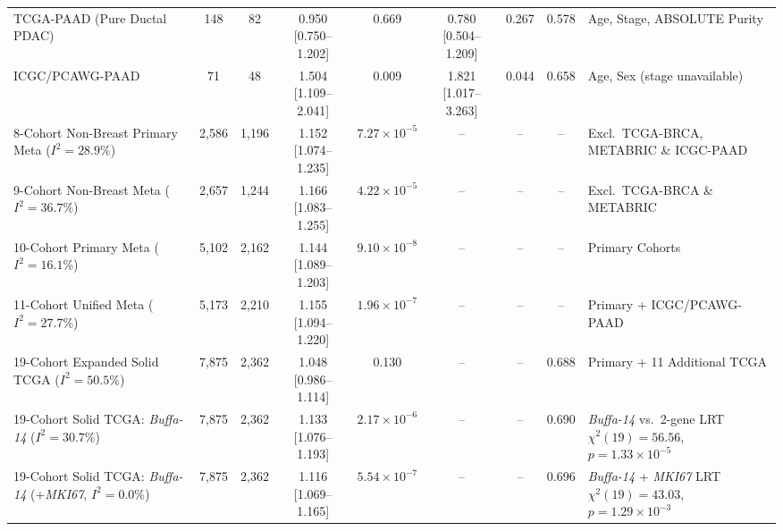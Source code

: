 \documentclass[10pt,twocolumn]{article}
\begin{document}
\begin{table}[t]
{\begin{tabular}{@{}lccccccc>{\raggedright\arraybackslash}p{3.9cm}@{}}
\midrule
TCGA-PAAD (Pure Ductal PDAC) & 148 & 82 & 0.950 [0.750--1.202] & 0.669 & 0.780 [0.504--1.209] & 0.267 & 0.578 & Age, Stage, ABSOLUTE Purity \\
ICGC/PCAWG-PAAD & 71 & 48 & 1.504 [1.109--2.041] & 0.009 & 1.821 [1.017--3.263] & 0.044 & 0.658 & Age, Sex (stage unavailable) \\
\midrule
8-Cohort Non-Breast Primary Meta ($I^2 = 28.9\%$) & 2,586 & 1,196 & 1.152 [1.074--1.235] & $7.27 \times 10^{-5}$ & -- & -- & -- & Excl.\ TCGA-BRCA, METABRIC \& ICGC-PAAD \\
9-Cohort Non-Breast Meta ($I^2 = 36.7\%$) & 2,657 & 1,244 & 1.166 [1.083--1.255] & $4.22 \times 10^{-5}$ & -- & -- & -- & Excl.\ TCGA-BRCA \& METABRIC \\
10-Cohort Primary Meta ($I^2 = 16.1\%$) & 5,102 & 2,162 & 1.144 [1.089--1.203] & $9.10 \times 10^{-8}$ & -- & -- & -- & 10 Primary Cohorts \\
11-Cohort Unified Meta ($I^2 = 27.7\%$) & 5,173 & 2,210 & 1.155 [1.094--1.220] & $1.96 \times 10^{-7}$ & -- & -- & -- & 10 Primary + ICGC/PCAWG-PAAD \\
19-Cohort Expanded Solid TCGA ($I^2 = 50.5\%$) & 7,875 & 2,362 & 1.048 [0.986--1.114] & 0.130 & -- & -- & 0.688 & 8 Primary + 11 Additional TCGA \\
19-Cohort Solid TCGA: \textit{Buffa-14} ($I^2 = 30.7\%$) & 7,875 & 2,362 & 1.133 [1.076--1.193] & $2.17 \times 10^{-6}$ & -- & -- & 0.690 & \textit{Buffa-14} vs.\ 2-gene LRT $\chi^2(19)=56.56$, $p=1.33\times 10^{-5}$ \\
19-Cohort Solid TCGA: \textit{Buffa-14} (+\textit{MKI67}, $I^2 = 0.0\%$) & 7,875 & 2,362 & 1.116 [1.069--1.165] & $5.54 \times 10^{-7}$ & -- & -- & 0.696 & \textit{Buffa-14} + \textit{MKI67} LRT $\chi^2(19)=43.03$, $p=1.29\times 10^{-3}$ \\
\bottomrule
\end{tabular}%
}
\end{table}
\end{document}
